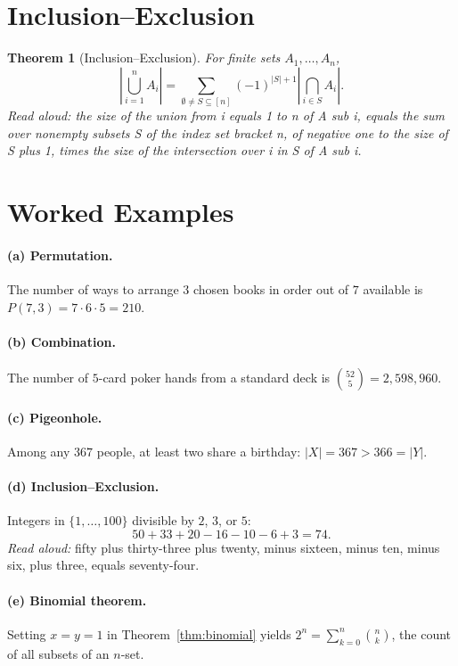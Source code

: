 \documentclass[11pt]{article}
\newtheorem{theorem}{Theorem}
\theoremstyle{definition}
\theoremstyle{remark}
\begin{document}
\section*{Inclusion--Exclusion}

\begin{theorem}[Inclusion--Exclusion]
For finite sets $A_1,\ldots,A_n$,
\[
  \left| \bigcup_{i=1}^{n} A_i \right|
  = \sum_{\emptyset \neq S \subseteq [n]} (-1)^{|S|+1}
     \left| \bigcap_{i \in S} A_i \right|.
\]
\emph{Read aloud:} the size of the union from i equals 1 to n of A sub
i, equals the sum over nonempty subsets S of the index set bracket n,
of negative one to the size of S plus 1, times the size of the
intersection over i in S of A sub i.
\end{theorem}

\section*{Worked Examples}

\paragraph{(a) Permutation.} The number of ways to arrange $3$ chosen
books in order out of $7$ available is $P(7,3) = 7\cdot 6 \cdot 5 = 210$.

\paragraph{(b) Combination.} The number of $5$-card poker hands from a
standard deck is $\binom{52}{5} = 2{,}598{,}960$.

\paragraph{(c) Pigeonhole.} Among any $367$ people, at least two share a
birthday: $|X|=367 > 366 = |Y|$.

\paragraph{(d) Inclusion--Exclusion.} Integers in $\{1,\ldots,100\}$
divisible by $2$, $3$, or $5$:
\[
  50 + 33 + 20 - 16 - 10 - 6 + 3 = 74.
\]
\emph{Read aloud:} fifty plus thirty-three plus twenty, minus sixteen,
minus ten, minus six, plus three, equals seventy-four.

\paragraph{(e) Binomial theorem.} Setting $x = y = 1$ in
Theorem~\ref{thm:binomial} yields $2^n = \sum_{k=0}^n \binom{n}{k}$, the
count of all subsets of an $n$-set.
\end{document}
